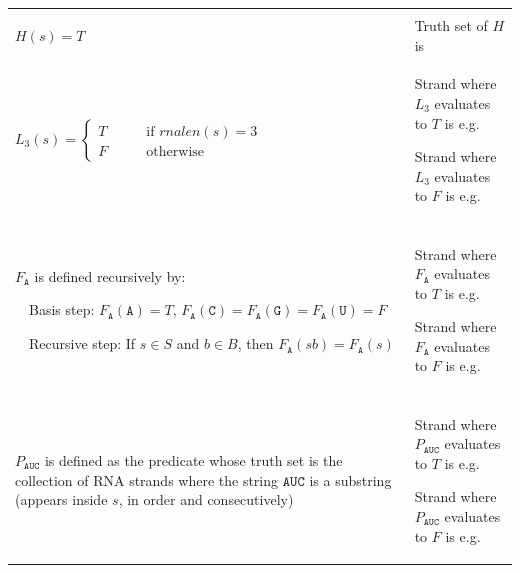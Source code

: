 \documentclass[12pt, oneside]{article}
\newcommand{\A}[0]{\texttt{A}}
\newcommand{\C}[0]{\texttt{C}}
\newcommand{\G}[0]{\texttt{G}}
\newcommand{\U}[0]{\texttt{U}}
\begin{document}
\begin{center}
\begin{tabular}{|p{4in}p{3.5in}|}
\hline
& \\
$H(s) = T$ & Truth set of $H$ is \underline{\phantom{$S$\hspace{1in}}}\\
\hline
$L_3(s) = \begin{cases}
T &\qquad\text{if $rnalen(s) = 3$} \\
F & \qquad\text{otherwise}
\end{cases}$ & 
Strand where $L_3$ evaluates to $T$ is e.g.\underline{\phantom{$\A\A\A$~\hspace{0.3in}}}

\vspace{10pt}

Strand where $L_3$ evaluates to $F$ is e.g. \underline{\phantom{$\A\A\U\A$\hspace{0.3in}}}\\
\hline
& \\
$F_{\A}$ is defined recursively by: 

~~Basis step: $F_{\A}(\A) = T$, $F_{\A}(\C) = F_{\A}(\G) = F_{\A}(\U) = F$

~~Recursive step: If $s \in S$ and $b \in B$, then $F_{\A}(sb) = F_{\A}(s)$& 
Strand where $F_{\A}$ evaluates to $T$ is e.g.\underline{\phantom{$\A\C\G$~\hspace{0.3in}}}

\vspace{10pt}

Strand where $F_{\A}$ evaluates to $F$ is e.g. \underline{\phantom{$\U\A\C\U$\hspace{0.3in}}}\\
\hline
& \\
$P_{\A\U\C}$ is defined as the predicate whose truth set
is the collection of RNA strands where the string $\A\U\C$
is a substring (appears inside $s$, in order and consecutively)& 
Strand where $P_{\A\U\C}$ evaluates to $T$ is e.g.\underline{\phantom{$\A\A\A$~\hspace{0.3in}}}

\vspace{10pt}

Strand where $P_{\A\U\C}$ evaluates to $F$ is e.g. \underline{\phantom{$\A\A\U\A$\hspace{0.3in}}}\\
\hline
\end{tabular}
\end{center}
\end{document}
